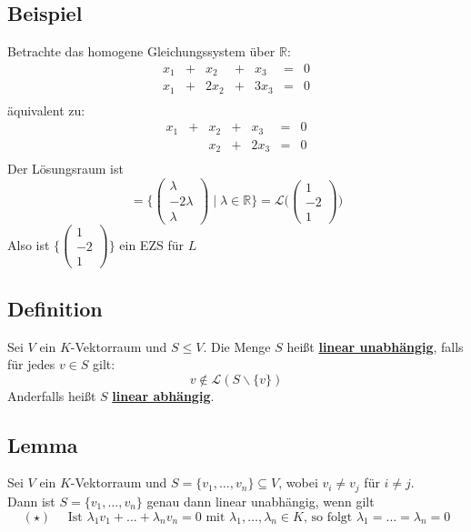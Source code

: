 \subsection{Beispiel} %
\label{sub:beispiel}
Betrachte das homogene Gleichungssystem über $\mathds{R}$:
\[
	\begin{array}{lccllll}
	x_1 & + & x_2 & + & x_3 & = & 0 \\
	x_1 & + & 2 x_2  & + & 3 x_3 &  =  & 0 \\
\end{array}
\]
äquivalent zu:
\[
	\begin{array}{lccllll}
	x_1 & + & x_2 & + & x_3 & = & 0 \\
	 &  & x_2  & + & 2 x_3 &  =  & 0 \\
\end{array}
\]
Der Lösungsraum ist \[
	= \Bigg\{ \begin{pmatrix} \lambda \\ -2 \lambda \\ \lambda \end{pmatrix} \mid \lambda \in \mathds{R} \Bigg\} 
= \mathcal{L} \Bigg( \begin{pmatrix}1 \\ -2 \\ 1  \end{pmatrix} \Bigg)
\]
Also ist $ \Bigg\{ \begin{pmatrix}1 \\ -2 \\1 \end{pmatrix} \Bigg\}$ ein EZS für $L$

\subsection{Definition} %
\label{sub:definition}
Sei $V$ ein $K$-Vektorraum und $S \leq V$. Die Menge $S$ heißt \underline{\textbf{linear unabhängig}}, falls für jedes $v \in S$ gilt:
\[
	v \not\in \mathcal{L} (S \backslash \{v\})
\]
Anderfalls heißt $S$ \textbf{\underline{linear abhängig}}.

\subsection{Lemma} %
\label{sub:Lemma}
Sei $V$ ein $K$-Vektorraum und $S= \{ v_1, \ldots , v_n\} \subseteq V$, wobei $v_i \not= v_j$ für $i \not= j$. \\
Dann ist $S= \{ v_1, \ldots  , v_n\}$ genau dann linear unabhängig, wenn gilt
\[
	(\star) \quad \text{ Ist } \lambda_1 v_1 + \ldots  + \lambda_n v_n = 0 \text{ mit } \lambda_1, \ldots , \lambda_n \in K \text{, so folgt } \lambda_1 = \ldots = \lambda_n = 0
\]

